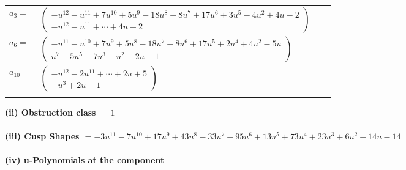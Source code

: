 \documentclass[1p]{elsarticle_modified}
\theoremstyle{definition}
\begin{document}
\begin{tabular}{m{7pt} m{180pt} m{7pt} m{180pt} }
\flushright $a_{3}=$&$\begin{pmatrix}- u^{12}- u^{11}+7 u^{10}+5 u^9-18 u^8-8 u^7+17 u^6+3 u^5-4 u^2+4 u-2\\- u^{12}- u^{11}+\cdots+4 u+2\end{pmatrix}$ \\
\flushright $a_{6}=$&$\begin{pmatrix}- u^{11}- u^{10}+7 u^9+5 u^8-18 u^7-8 u^6+17 u^5+2 u^4+4 u^2-5 u\\u^7-5 u^5+7 u^3+u^2-2 u-1\end{pmatrix}$ \\
\flushright $a_{10}=$&$\begin{pmatrix}- u^{12}-2 u^{11}+\cdots+2 u+5\\- u^3+2 u-1\end{pmatrix}$\\&\end{tabular}
\flushleft \textbf{(ii) Obstruction class $= 1$}\\~\\
\flushleft \textbf{(iii) Cusp Shapes $= -3 u^{11}-7 u^{10}+17 u^9+43 u^8-33 u^7-95 u^6+13 u^5+73 u^4+23 u^3+6 u^2-14 u-14$}\\~\\
\newpage\renewcommand{\arraystretch}{1}
\flushleft \textbf{(iv) u-Polynomials at the component}\newline \\
\end{document}
